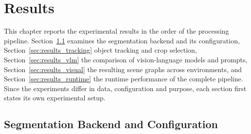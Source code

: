 \chapter{Results}
\label{chap:results}

{\small This chapter reports the experimental results in the order of the processing pipeline. Section~\ref{sec:results_segmentation} examines the segmentation backend and its configuration, Section~\ref{sec:results_tracking} object tracking and crop selection, Section~\ref{sec:results_vlm} the comparison of vision-language models and prompts, Section~\ref{sec:results_visual} the resulting scene graphs across environments, and Section~\ref{sec:results_runtime} the runtime performance of the complete pipeline. Since the experiments differ in data, configuration and purpose, each section first states its own experimental setup.\par}


\pqBackendTable

\pqGridTable

\pqNmsTable

\pqThrTable

\section{Segmentation Backend and Configuration}
\label{sec:results_segmentation}

